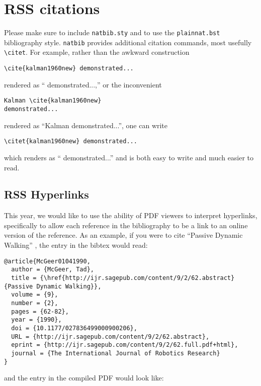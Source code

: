 \documentclass[conference]{IEEEtran}
\begin{document}
\section{RSS citations}

Please make sure to include \verb!natbib.sty! and to use the
\verb!plainnat.bst! bibliography style. \verb!natbib! provides additional
citation commands, most usefully \verb!\citet!. For example, rather than the
awkward construction 

{\small
\begin{verbatim}
\cite{kalman1960new} demonstrated...
\end{verbatim}
}

\noindent
rendered as ``\cite{kalman1960new} demonstrated...,''
or the
inconvenient 

{\small
\begin{verbatim}
Kalman \cite{kalman1960new} 
demonstrated...
\end{verbatim}
}

\noindent
rendered as 
``Kalman \cite{kalman1960new} demonstrated...'', 
one can
write 

{\small
\begin{verbatim}
\citet{kalman1960new} demonstrated... 
\end{verbatim}
}
\noindent
which renders as ``\citet{kalman1960new} demonstrated...'' and is 
both easy to write and much easier to read.
  
\subsection{RSS Hyperlinks}

This year, we would like to use the ability of PDF viewers to interpret
hyperlinks, specifically to allow each reference in the bibliography to be a
link to an online version of the reference. 
As an example, if you were to cite ``Passive Dynamic Walking''
\cite{McGeer01041990}, the entry in the bibtex would read:

{\small
\begin{verbatim}
@article{McGeer01041990,
  author = {McGeer, Tad}, 
  title = {\href{http://ijr.sagepub.com/content/9/2/62.abstract}{Passive Dynamic Walking}}, 
  volume = {9}, 
  number = {2}, 
  pages = {62-82}, 
  year = {1990}, 
  doi = {10.1177/027836499000900206}, 
  URL = {http://ijr.sagepub.com/content/9/2/62.abstract}, 
  eprint = {http://ijr.sagepub.com/content/9/2/62.full.pdf+html}, 
  journal = {The International Journal of Robotics Research}
}
\end{verbatim}
}
\noindent
and the entry in the compiled PDF would look like:
\end{document}
